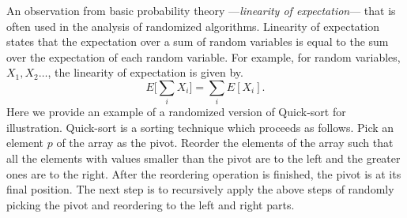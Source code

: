 An observation from basic probability theory ---\textit{linearity of expectation}--- that is often used in the analysis of randomized algorithms.
Linearity of expectation states that the expectation over a sum of random variables is equal to the sum over the expectation of each random variable.
For example, for random variables, $X_1, X_2 \ldots$, the linearity of expectation is given by.
\begin{equation}
 E\big[\sum_i X_i\big] = \sum_i E[X_i].
\end{equation}
Here we provide an example of a randomized version of Quick-sort for illustration. 
Quick-sort is a sorting technique which proceeds as follows.
Pick an element $p$ of the array as the pivot.
Reorder the elements of the array such that all the elements with values smaller than the pivot are to the left and the greater ones are to the right. After the reordering operation is finished, the pivot is at its final position.
The next step is to recursively apply the above steps of randomly picking the pivot and reordering to the left and right parts.

